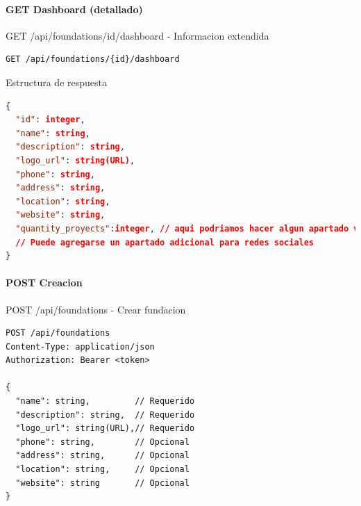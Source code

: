 \documentclass[11pt,a4paper]{article}
\begin{document}
\paragraph{GET Dashboard (detallado)}

\begin{center}
	\begin{minipage}{\textwidth}
		\begin{codebox}{GET /api/foundations/{id}/dashboard - Informacion extendida}
			\begin{lstlisting}[language=HTTP]
GET /api/foundations/{id}/dashboard
\end{lstlisting}
		\end{codebox}
	\end{minipage}
\end{center}

\begin{center}
	\begin{minipage}{\textwidth}
		\begin{codebox}{Estructura de respuesta}
			\begin{lstlisting}[language=json]
{
  "id": integer,
  "name": string,
  "description": string,
  "logo_url": string(URL),
  "phone": string,
  "address": string,
  "location": string,
  "website": string,
  "quantity_proyects":integer, // aqui podriamos hacer algun apartado visual bonito
  // Puede agregarse un apartado adicional para redes sociales
}
\end{lstlisting}
		\end{codebox}
	\end{minipage}
\end{center}

\paragraph{POST Creacion}

\begin{center}
	\begin{minipage}{\textwidth}
		\begin{codebox}{POST /api/foundations - Crear fundacion}
			\begin{lstlisting}[language=HTTP]
POST /api/foundations
Content-Type: application/json
Authorization: Bearer <token>

{
  "name": string,         // Requerido
  "description": string,  // Requerido
  "logo_url": string(URL),// Requerido
  "phone": string,        // Opcional
  "address": string,      // Opcional
  "location": string,     // Opcional
  "website": string       // Opcional
}
\end{lstlisting}
		\end{codebox}
	\end{minipage}
\end{center}
\end{document}
